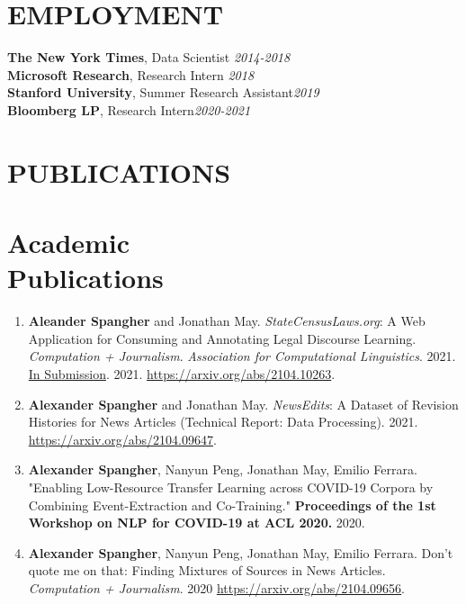 \documentclass[margin]{res}
\newcommand{\fullhrulefill}{%
	\vspace{.7\baselineskip}
	\hspace*{-\sectionwidth}\hrulefill%
}
\begin{document}
\begin{resume}
\section{EMPLOYMENT}
{\bf The New York Times}, Data Scientist  \hfill {\sl 2014-2018}\\
{\bf Microsoft Research}, Research Intern \hfill {\sl 2018}\\
{\bf Stanford University}, Summer Research Assistant\hfill {\sl 2019}\\
{\bf Bloomberg LP}, Research Intern\hfill {\sl 2020-2021}\\

\section{PUBLICATIONS}
\fullhrulefill
\section{Academic\\Publications}
\begin{enumerate}
	\item \textbf{Aleander Spangher} and Jonathan May. \textit{StateCensusLaws.org}: A Web Application for Consuming and Annotating Legal Discourse Learning. \textit{Computation + Journalism}. \textit{Association for Computational Linguistics}. 2021. \underline{In Submission}. 2021. \url{https://arxiv.org/abs/2104.10263}.
	
	\item \textbf{Alexander Spangher} and Jonathan May. \textit{NewsEdits}: A Dataset of Revision Histories for News Articles (Technical Report: Data Processing).  2021. \url{https://arxiv.org/abs/2104.09647}.
	
	\item \textbf{Alexander Spangher}, Nanyun Peng, Jonathan May, Emilio Ferrara. "Enabling Low-Resource Transfer Learning across COVID-19 Corpora by Combining Event-Extraction and Co-Training." \textbf{Proceedings of the 1st Workshop on NLP for COVID-19 at ACL 2020.} 2020.
	
	\item \textbf{Alexander Spangher}, Nanyun Peng, Jonathan May, Emilio Ferrara. Don't quote me on that: Finding Mixtures of Sources in News Articles. \textit{Computation + Journalism}. 2020 \url{https://arxiv.org/abs/2104.09656}.
	

\end{enumerate}
\end{resume}
\end{document}
